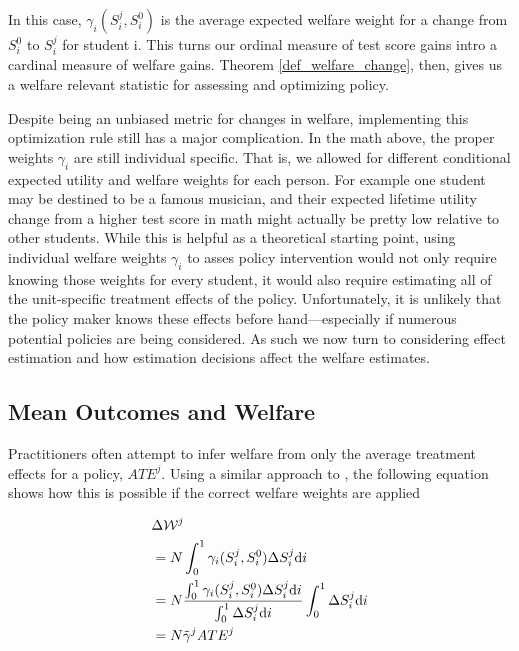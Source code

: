 \documentclass[12pt]{article}
\theoremstyle{definition}
\theoremstyle{definition}
\theoremstyle{definition}
\theoremstyle{definition}
\begin{document}
   
 
    In this case, $\gamma_i(S_i^j, S_i^0) $ is the average expected welfare weight for a change from $S_i^0$ to $S_i^j$ for student i. This turns our ordinal measure of test score gains intro a cardinal measure of welfare gains. Theorem \ref{def_welfare_change}, then, gives us a welfare relevant statistic for assessing and optimizing policy.

 Despite being an unbiased metric for changes in welfare, implementing this optimization rule still has a major complication. In the math above, the proper weights  $\gamma_i$ are still individual specific. That is, we allowed for different conditional expected utility and welfare weights for each person. For example one student may be destined to be a famous musician, and their expected lifetime utility change from a higher test score in math might actually be pretty low relative to other students. While this is helpful as a theoretical starting point, using individual welfare weights  $\gamma_i$ to asses policy intervention would not only require knowing those weights for every student, it would also require estimating all of the unit-specific treatment effects of the policy. Unfortunately, it is unlikely that the policy maker knows these effects before hand---especially if numerous potential policies are being considered. As such we now turn to considering effect estimation and how estimation decisions affect the welfare estimates.
    
    
    \subsection{Mean Outcomes and Welfare}

    Practitioners often attempt to infer welfare from only the average treatment effects for a policy, $ATE^j$. Using a similar approach to  \cite{Keyser_2020}, the following equation shows how this is possible if the correct welfare weights are applied


    \begin{align}
           & \Delta \mathcal{W}^j \\
           &  = N \int_0^1 \gamma_i(S_i^j, S_i^0) \Delta S^j_i \text{d}i\\
           & = N \frac{\int_0^1 \gamma_i(S_i^j, S_i^0) \Delta S^j_i \text{d}i}{\int_0^1 \Delta S^j_i \text{d}i} \int_0^1 \Delta S^j_i \text{d}i \\
           & =  N \Tilde{\gamma}^j ATE^j 
    \end{align}
\end{document}
